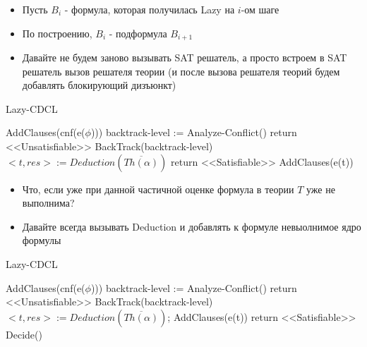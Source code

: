 \documentclass{beamer}
\begin{document}
\begin{frame}
\begin{itemize}
\item Пусть $B_i$ - формула, которая получилась Lazy на $i$-ом шаге
\item По построению, $B_i$ - подформула $B_{i+1}$
\item Давайте не будем заново вызывать SAT решатель, а просто встроем в SAT решатель вызов решателя теории (и после вызова
решателя теорий будем добавлять блокирующий дизъюнкт)
\end{itemize}
\end{frame}

\begin{frame}{Lazy-CDCL}
\begin{algorithmic}
\State AddClauses(cnf(e($\phi$)))
        \State backtrack-level := Analyze-Conflict()
            \State return <<Unsatisfiable>>
        \Else
            \State BackTrack(backtrack-level)
        \EndIf
            \State $<t, res> := Deduction(\overline{Th(\alpha)})$
                \State return <<Satisfiable>>
            \EndIf
            \State AddClauses(e(t))
        \EndIf
    \EndWhile
\EndWhile
\end{algorithmic}
\end{frame}

\begin{frame}
\begin{itemize}
\item Что, если уже при данной частичной оценке формула в теории $T$ уже не выполнима?
\item Давайте всегда вызывать Deduction и добавлять к формуле невыолнимое ядро формулы
\end{itemize}
\end{frame}

\begin{frame}{Lazy-CDCL}
\begin{algorithmic}
\State AddClauses(cnf(e($\phi$)))
    \Repeat
            \State backtrack-level := Analyze-Conflict()
                \State return <<Unsatisfiable>>
            \Else
                \State BackTrack(backtrack-level)
            \EndIf
            \State $<t, res> := Deduction(\overline{Th(\alpha)})$; AddClauses(e(t))
        \EndWhile
        \State return <<Satisfiable>>
    \EndIf
    \State Decide()
\EndWhile
\end{algorithmic}
\end{frame}
\end{document}

